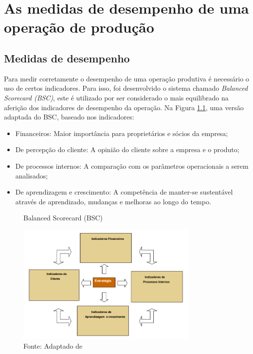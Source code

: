 \chapter{ As medidas de desempenho de uma operação de produção} 
\label{chap:medida_desempenho_operacao_prod} 

\section{Medidas de desempenho} 
\label{sec:sistemas_produtivos_desempenho} 
Para medir corretamente o desempenho de uma operação produtiva é necessário o uso de certos indicadores. Para isso, foi desenvolvido o sistema chamado \textit{Balanced Scorecard (BSC)}, este é utilizado por ser considerado o mais equilibrado na aferição dos indicadores de desempenho da operação.
Na Figura \ref{fig:balanced_scorecard}, uma versão adaptada do BSC, baseado nos indicadores:

\begin{itemize}
    \item Financeiros: Maior importância para proprietários e sócios da empresa;
    \item De percepção do cliente: A opinião do cliente sobre a empresa e o produto;
    \item De processos internos: A comparação com os parâmetros operacionais a serem analisados;
    \item De aprendizagem e crescimento: A competência de manter-se sustentável através de aprendizado, mudanças e melhoras ao longo do tempo.  
\end{itemize}


\begin{figure}[H]
    \centering
    \caption{Balanced Scorecard (BSC)}
    \includegraphics[width =0.8\textwidth]{images/bsc.png}
    \caption*{Fonte: Adaptado de \cite{kaplan1996using}}
    \label{fig:balanced_scorecard}
\end{figure}

